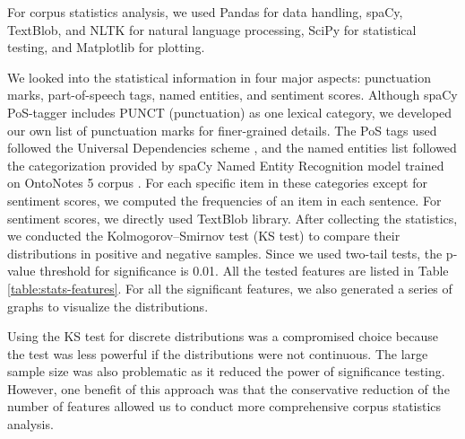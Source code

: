 \documentclass[12pt]{diazessay} %
\begin{document}
{For corpus statistics analysis, we used Pandas for data handling, spaCy, TextBlob, and NLTK for natural language processing, SciPy for statistical testing, and Matplotlib for plotting. 

We looked into the statistical information in four major aspects: punctuation marks, part-of-speech tags, named entities, and sentiment scores. Although spaCy PoS-tagger includes PUNCT (punctuation) as one lexical category, we developed our own list of punctuation marks for finer-grained details. The PoS tags used followed the Universal Dependencies scheme \citep{pos-tag}, and the named entities list followed the categorization provided by spaCy Named Entity Recognition model trained on OntoNotes 5 corpus \citep{spacy-named-entity}. For each specific item in these categories except for sentiment scores, we computed the frequencies of an item in each sentence. For sentiment scores, we directly used TextBlob library. After collecting the statistics, we conducted the Kolmogorov–Smirnov test (KS test) to compare their distributions in positive and negative samples. Since we used two-tail tests, the p-value threshold for significance is 0.01. All the tested features are listed in Table \ref{table:stats-features}. For all the significant features, we also generated a series of graphs to visualize the distributions. 

Using the KS test for discrete distributions was a compromised choice because the test was less powerful if the distributions were not continuous. The large sample size was also problematic as it reduced the power of significance testing. However, one benefit of this approach was that the conservative reduction of the number of features allowed us to conduct more comprehensive corpus statistics analysis.

}
\end{document}
